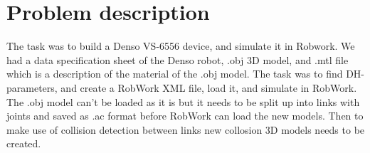 \section{Problem description}
\label{sec:description}

The task was to build a Denso VS-6556 device, and simulate it in Robwork. We had a data specification sheet of the Denso robot, .obj 3D model, and .mtl file which is a description of the material of the .obj model. The task was to find DH-parameters, and create a RobWork XML file, load it,
and simulate in RobWork. The .obj model can't be loaded as it is but it needs to be split up into links with joints and saved as .ac format before RobWork can load the new models. Then to make use of collision detection between links new collosion 3D models needs to be created. 
